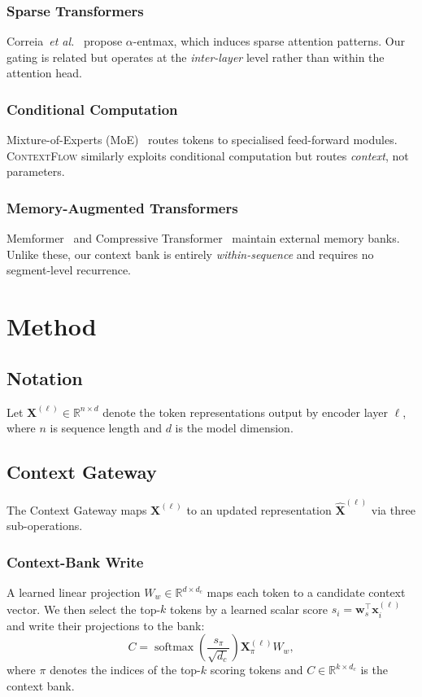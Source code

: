 \documentclass[10pt,twocolumn]{article}
\theoremstyle{plain}
\theoremstyle{definition}
\theoremstyle{remark}
\newcommand{\modelname}{\textsc{ContextFlow}}
\newcommand{\etal}{\textit{et al.}}
\DeclareMathOperator{\softmax}{softmax}
\begin{document}
\subsubsection{Sparse Transformers}
Correia~\etal~\cite{correia2019adaptively} propose $\alpha$-entmax, which
induces sparse attention patterns. Our gating is related but operates at the
\emph{inter-layer} level rather than within the attention head.

\subsubsection{Conditional Computation}
Mixture-of-Experts (MoE)~\cite{shazeer2017outrageously} routes tokens to
specialised feed-forward modules. \modelname{} similarly exploits conditional
computation but routes \emph{context}, not parameters.

\subsubsection{Memory-Augmented Transformers}
Memformer~\cite{wu2020memformer} and Compressive Transformer~\cite{rae2020compressive}
maintain external memory banks. Unlike these, our context bank is entirely
\emph{within-sequence} and requires no segment-level recurrence.

\section{Method}
\label{sec:method}

\subsection{Notation}

Let $\mathbf{X}^{(\ell)} \in \mathbb{R}^{n \times d}$ denote the token
representations output by encoder layer $\ell$, where $n$ is sequence length
and $d$ is the model dimension.

\subsection{Context Gateway}

The Context Gateway maps $\mathbf{X}^{(\ell)}$ to an updated representation
$\hat{\mathbf{X}}^{(\ell)}$ via three sub-operations.

\subsubsection{Context-Bank Write}
A learned linear projection $W_w \in \mathbb{R}^{d \times d_c}$ maps each token
to a candidate context vector. We then select the top-$k$ tokens by a learned
scalar score $s_i = \mathbf{w}_s^\top \mathbf{x}_i^{(\ell)}$ and write their
projections to the bank:
\begin{equation}
  C = \softmax\!\left(\frac{s_{\pi}}{\sqrt{d_c}}\right)
      \mathbf{X}^{(\ell)}_\pi W_w,
  \label{eq:write}
\end{equation}
where $\pi$ denotes the indices of the top-$k$ scoring tokens and
$C \in \mathbb{R}^{k \times d_c}$ is the context bank.
\end{document}
